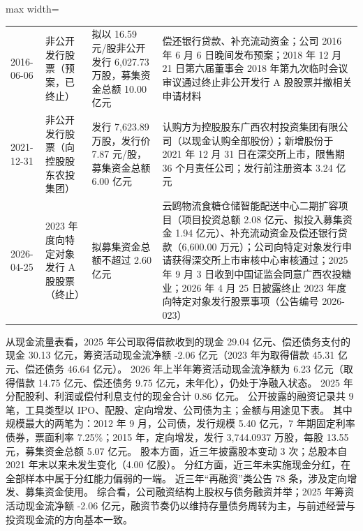 \begin{center}
\begin{adjustbox}{max width=\textwidth}
\begin{tabular}{@{}p{1.45cm}p{2.55cm}p{4.05cm}p{4.95cm}@{}}
2016-06-06 & 非公开发行股票（预案，已终止） & 拟以 16.59 元/\allowbreak{}股非公开发行 6,\allowbreak{}027.73 万股，\allowbreak{}募集资金总额 10.00 亿元 & 偿还银行贷款、\allowbreak{}补充流动资金；公司 2016 年 6 月 6 日晚间发布预案；2018 年 12 月 21 日第六届董事会 2018 年第九次临时会议审议通过终止非公开发行 A 股股票并撤相关申请材料 \\
2021-12-31 & 非公开发行股票（向控股股东农投集团） & 发行 7,\allowbreak{}623.89 万股，\allowbreak{}发行价 7.87 元/\allowbreak{}股，\allowbreak{}募集资金总额 6.00 亿元 & 认购方为控股股东广西农村投资集团有限公司（以现金认购全部股份）；新增股份于 2021 年 12 月 31 日在深交所上市，\allowbreak{}限售期 36 个月责任公司；发行前注册资本 3.24 亿元 \\
2026-04-25 & 2023 年度向特定对象发行 A 股股票（终止） & 拟募集资金总额不超过 2.60 亿元 & 云鸥物流食糖仓储智能配送中心二期扩容项目（项目投资总额 2.08 亿元、\allowbreak{}拟投入募集资金 1.94 亿元）、\allowbreak{}补充流动资金及偿还银行贷款（6,\allowbreak{}600.00 万元）；公司向特定对象发行申请获得深交所上市审核中心审核通过；2025 年 9 月 3 日收到中国证监会同意广西农投糖业；2026 年 4 月 25 日披露终止 2023 年度向特定对象发行股票事项（公告编号 2026-023） \\
\bottomrule
\end{tabular}
\end{adjustbox}
\end{center}

 从现金流量表看，2025 年公司取得借款收到的现金 29.04 亿元、偿还债务支付的现金 30.13 亿元，筹资活动现金流净额 -2.06 亿元（2023 年为取得借款 45.31 亿元、偿还债务 46.64 亿元）。 2026 年上半年筹资活动现金流净额为 6.23 亿元（取得借款 14.75 亿元、偿还债务 9.75 亿元，未年化），仍处于净融入状态。 2025 年分配股利、利润或偿付利息支付的现金合计 0.86 亿元。 公开披露的融资记录共 9 笔，工具类型以 IPO、配股、定向增发、公司债为主；金额与用途见下表。 其中规模最大的两笔为：2012 年 9 月，公司债，发行规模 5.40 亿元，7 年期固定利率债券，票面利率 7.25\%；2015 年，定向增发，发行 3,744.0937 万股，每股 13.55 元，募集资金总额 5.07 亿元。 股本方面，近三年披露股本变动 3 次；总股本自 2021 年末以来未发生变化（4.00 亿股）。 分红方面，近三年未实施现金分红，在全部样本中属于分红能力偏弱的一端。 近三年“再融资”类公告 78 条，涉及定向增发、募集资金使用。 综合看，公司融资结构上股权与债务融资并举；2025 年筹资活动现金流净额 -2.06 亿元，融资节奏仍以维持存量债务周转为主，与前述经营与投资现金流的方向基本一致。

